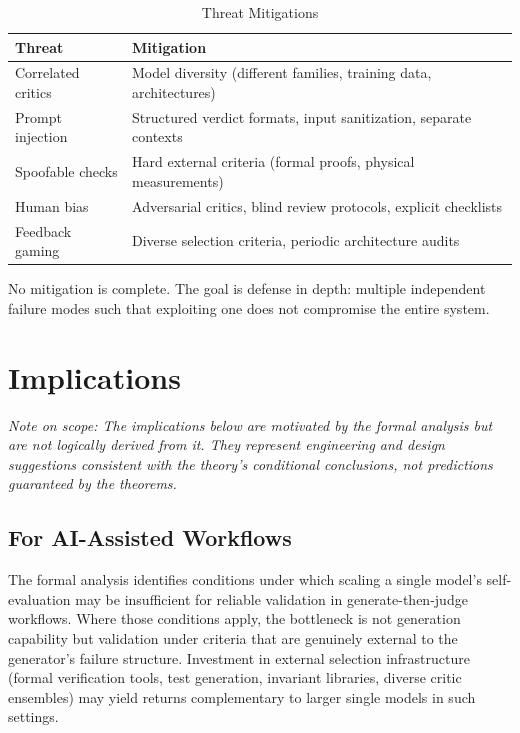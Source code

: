 \documentclass[11pt]{article}
\begin{document}
\begin{table}[h]
\centering
\caption{Threat Mitigations}
\begin{tabular}{ll}
\toprule
\textbf{Threat} & \textbf{Mitigation} \\
\midrule
Correlated critics & Model diversity (different families, training data, architectures) \\
Prompt injection & Structured verdict formats, input sanitization, separate contexts \\
Spoofable checks & Hard external criteria (formal proofs, physical measurements) \\
Human bias & Adversarial critics, blind review protocols, explicit checklists \\
Feedback gaming & Diverse selection criteria, periodic architecture audits \\
\bottomrule
\end{tabular}
\end{table}

No mitigation is complete. The goal is defense in depth: multiple independent failure modes
such that exploiting one does not compromise the entire system.

\section{Implications}

\emph{Note on scope: The implications below are motivated by the formal analysis but are
not logically derived from it. They represent engineering and design suggestions consistent
with the theory's conditional conclusions, not predictions guaranteed by the theorems.}

\subsection{For AI-Assisted Workflows}

The formal analysis identifies conditions under which scaling a single model's self-evaluation
may be insufficient for reliable validation in generate-then-judge workflows. Where those
conditions apply, the bottleneck is not generation capability but validation under criteria
that are genuinely external to the generator's failure structure. Investment in external
selection infrastructure (formal verification tools, test generation, invariant libraries,
diverse critic ensembles) may yield returns complementary to larger single models in such
settings.
\end{document}
